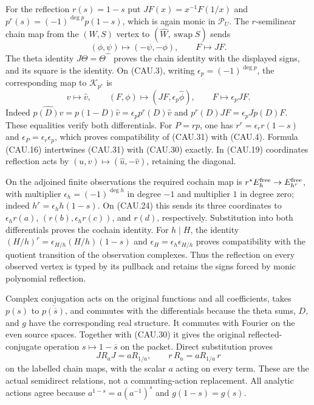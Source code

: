For the reflection $r(s)=1-s$ put
$JF(x)=x^{-1}F(1/x)$ and
$p^r(s)=(-1)^{\deg p}p(1-s)$, which is again monic in $\mathcal P_U$.
The $r$-semilinear chain map from the $(W,S)$ vertex to
$(\widehat W,\operatorname{swap}S)$ sends
\[
 (\phi,\psi)\longmapsto(-\psi,-\phi),\qquad F\longmapsto JF.
                                                               \tag{CAU.30}
\]
The theta identity $J\Theta=\Theta\widehat{\phantom\phi}$
proves the chain identity with the displayed signs, and its square
is the identity.  On (CAU.3), writing $\epsilon_p=(-1)^{\deg p}$,
the corresponding map to $\mathscr K_{p^r}$ is
\[
 v\mapsto\widehat v,\qquad
 (F,\phi)\mapsto(JF,\epsilon_p\widehat\phi),\qquad
 F\mapsto\epsilon_p JF.                                     \tag{CAU.31}
\]
Indeed $\widehat{p(D)v}=p(1-D)\widehat v=
\epsilon_pp^r(D)\widehat v$ and
$p^r(D)JF=\epsilon_pJp(D)F$.  These equalities verify both
differentials.  For $P=rp$, one has
$r^r=\epsilon_r r(1-s)$ and $\epsilon_P=\epsilon_r\epsilon_p$,
which proves compatibility of (CAU.31) with (CAU.4).
Formula (CAU.16) intertwines (CAU.31) with (CAU.30) exactly.
In (CAU.19) coordinates reflection acts by
$(u,v)\mapsto(\widehat u,-\widehat v)$, retaining the diagonal.

On the adjoined finite observations the required cochain map is
$r^*E_h^{\rm free}\to E_{h^r}^{\rm free}$, with multiplier
$\epsilon_h=(-1)^{\deg h}$ in degree $-1$ and multiplier $1$ in
degree zero; indeed $h^r=\epsilon_h h(1-s)$.
On (CAU.24) this sends its three coordinates to
$\epsilon_h r(a)$, $(r(b),\epsilon_h r(c))$, and $r(d)$,
respectively.  Substitution into both differentials proves the
cochain identity.  For $h\mid H$, the identity
$(H/h)^r=\epsilon_{H/h}(H/h)(1-s)$ and
$\epsilon_H=\epsilon_h\epsilon_{H/h}$ proves compatibility with
the quotient transition of the observation complexes.  Thus the
reflection on every observed vertex is typed by its pullback and
retains the signs forced by monic polynomial reflection.

Complex conjugation acts on the original functions and all coefficients,
takes $p(s)$ to $\overline{p(\overline s)}$, and commutes with the
differentials because the theta sums, $D$, and $g$ have the corresponding
real structure.  It commutes with Fourier on the even source spaces.
Together with (CAU.30) it gives the original reflected-conjugate operation
$s\mapsto1-\overline s$ on the packet.  Direct substitution proves
\[
 JR_aJ=aR_{1/a},\qquad
 r\,R_a=aR_{1/a}\,r                                         \tag{CAU.32}
\]
on the labelled chain maps, with the scalar $a$ acting on every term.
These are the actual semidirect relations, not a commuting-action
replacement.  All analytic actions agree because
$a^{1-s}=a(a^{-1})^s$ and $g(1-s)=g(s)$.

